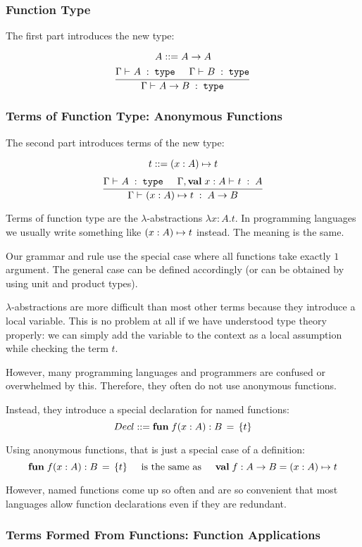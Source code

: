 \subsubsection{Function Type}

The first part introduces the new type:

\[A ::= A\to A\]
\[\cfrac{\Gamma\vdash^{}_{}A\;:\;\mathtt{type}\hspace*{.5cm} \Gamma\vdash^{}_{}B\;:\;\mathtt{type}}{\Gamma\vdash^{}_{}A\to B\;:\;\mathtt{type}}\,\]

\subsubsection{Terms of Function Type: Anonymous Functions}

The second part introduces terms of the new type:

\[t \bbc \alam[A]{x}{t}\]
\[\rul{\oftype{}{\Gamma}{A}{\type}\tb\oftype{}{\Gamma,\aval{x}{A}{}}{t}{A}}{\oftype{}{\Gamma}{\alam[A]{x}{t}}{A\to B}}\]

Terms of function type are the $\lambda$-abstractions $\lambda x:A.t$.
In programming languages we usually write something like $\alam[A]{x}{t}$ instead.
The meaning is the same.

Our grammar and rule use the special case where all functions take exactly $1$ argument.
The general case can be defined accordingly (or can be obtained by using unit and product types).

$\lambda$-abstractions are more difficult than most other terms because they introduce a local variable.
This is no problem at all if we have understood type theory properly: we can simply add the variable to the context as a local assumption while checking the term $t$.
\medskip

However, many programming languages and programmers are confused or overwhelmed by this.
Therefore, they often do not use anonymous functions.

Instead, they introduce a special declaration for named functions:
\[Decl \bbc \afunI[B]{f}{x:A}{t}\]

Using anonymous functions, that is just a special case of a definition:
\[\afunI[B]{f}{x:A}{t} \tb\text{is the same as}\tb \aval{f}{A\to B}{\alam[A]{x}{t}}\]

However, named functions come up so often and are so convenient that most languages allow function declarations even if they are redundant.

\subsubsection{Terms Formed From Functions: Function Applications}

